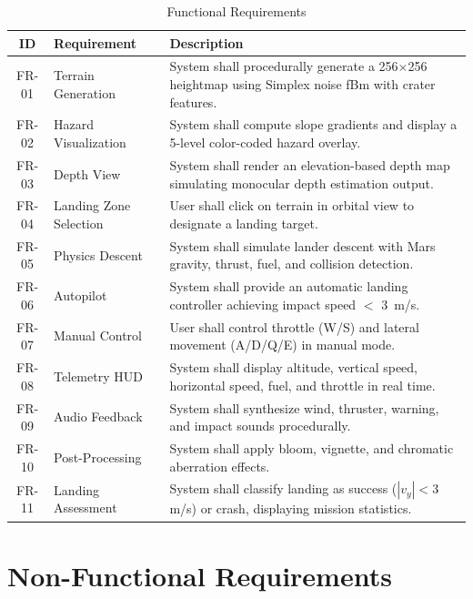 \begin{table}[h]
\centering
\caption{Functional Requirements}
\label{tab:func_req}
\begin{tabular}{|c|p{4cm}|p{7.5cm}|}
\hline
\textbf{ID} & \textbf{Requirement} & \textbf{Description} \\
\hline
FR-01 & Terrain Generation & System shall procedurally generate a 256$\times$256 heightmap using Simplex noise fBm with crater features. \\
\hline
FR-02 & Hazard Visualization & System shall compute slope gradients and display a 5-level color-coded hazard overlay. \\
\hline
FR-03 & Depth View & System shall render an elevation-based depth map simulating monocular depth estimation output. \\
\hline
FR-04 & Landing Zone Selection & User shall click on terrain in orbital view to designate a landing target. \\
\hline
FR-05 & Physics Descent & System shall simulate lander descent with Mars gravity, thrust, fuel, and collision detection. \\
\hline
FR-06 & Autopilot & System shall provide an automatic landing controller achieving impact speed $<$ 3~m/s. \\
\hline
FR-07 & Manual Control & User shall control throttle (W/S) and lateral movement (A/D/Q/E) in manual mode. \\
\hline
FR-08 & Telemetry HUD & System shall display altitude, vertical speed, horizontal speed, fuel, and throttle in real time. \\
\hline
FR-09 & Audio Feedback & System shall synthesize wind, thruster, warning, and impact sounds procedurally. \\
\hline
FR-10 & Post-Processing & System shall apply bloom, vignette, and chromatic aberration effects. \\
\hline
FR-11 & Landing Assessment & System shall classify landing as success ($|v_y| < 3$ m/s) or crash, displaying mission statistics. \\
\hline
\end{tabular}
\end{table}

\section{Non-Functional Requirements}


